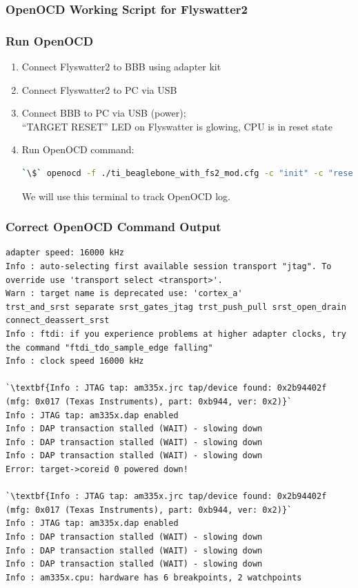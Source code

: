 \begin{frame}[containsverbatim,allowframebreaks=1]
  \frametitle{OpenOCD Working Script for Flyswatter2}
  
\end{frame}

\begin{frame}[containsverbatim]
  \frametitle{Run OpenOCD}
  \begin{enumerate}
  \item Connect Flyswatter2 to BBB using adapter kit
  \item Connect Flyswatter2 to PC via USB
  \item Connect BBB to PC via USB (power); \\
        ``TARGET RESET'' LED on Flyswatter is glowing, CPU is in reset state
  \item Run OpenOCD command:
    \begin{lstlisting}[language=bash,numbers=none]
`\$` openocd -f ./ti_beaglebone_with_fs2_mod.cfg -c "init" -c "reset init"
    \end{lstlisting}
  We will use this terminal to track OpenOCD log.
  \end{enumerate}
\end{frame}

\begin{frame}[containsverbatim]
  \frametitle{Correct OpenOCD Command Output}
  \vspace*{-5mm}
  \begin{lstlisting}[numbers=none]
adapter speed: 16000 kHz
Info : auto-selecting first available session transport "jtag". To override use 'transport select <transport>'.
Warn : target name is deprecated use: 'cortex_a'
trst_and_srst separate srst_gates_jtag trst_push_pull srst_open_drain connect_deassert_srst
Info : ftdi: if you experience problems at higher adapter clocks, try the command "ftdi_tdo_sample_edge falling"
Info : clock speed 16000 kHz

`\textbf{Info : JTAG tap: am335x.jrc tap/device found: 0x2b94402f (mfg: 0x017 (Texas Instruments), part: 0xb944, ver: 0x2)}`
Info : JTAG tap: am335x.dap enabled
Info : DAP transaction stalled (WAIT) - slowing down
Info : DAP transaction stalled (WAIT) - slowing down
Info : DAP transaction stalled (WAIT) - slowing down
Error: target->coreid 0 powered down!

`\textbf{Info : JTAG tap: am335x.jrc tap/device found: 0x2b94402f (mfg: 0x017 (Texas Instruments), part: 0xb944, ver: 0x2)}`
Info : JTAG tap: am335x.dap enabled
Info : DAP transaction stalled (WAIT) - slowing down
Info : DAP transaction stalled (WAIT) - slowing down
Info : DAP transaction stalled (WAIT) - slowing down
Info : am335x.cpu: hardware has 6 breakpoints, 2 watchpoints
  \end{lstlisting}
  \vspace*{-5mm}
\end{frame}

